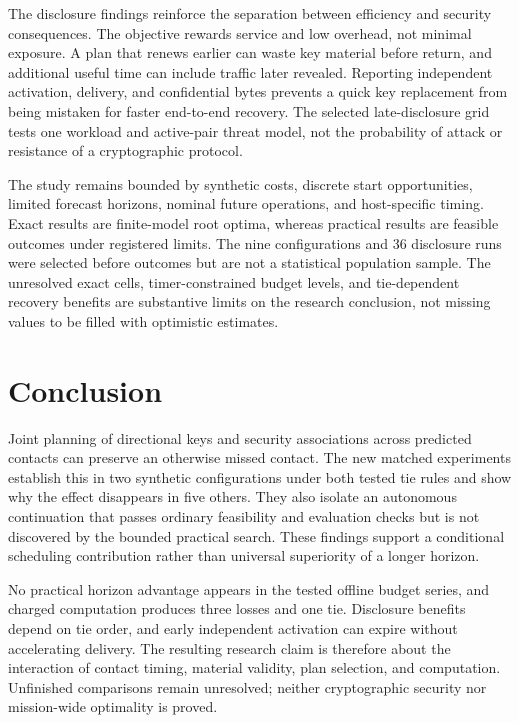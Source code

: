 \documentclass[12pt,a4paper]{article}
\begin{document}
The disclosure findings reinforce the separation between efficiency and security consequences. The objective rewards service and low overhead, not minimal exposure. A plan that renews earlier can waste key material before return, and additional useful time can include traffic later revealed. Reporting independent activation, delivery, and confidential bytes prevents a quick key replacement from being mistaken for faster end-to-end recovery. The selected late-disclosure grid tests one workload and active-pair threat model, not the probability of attack or resistance of a cryptographic protocol.

The study remains bounded by synthetic costs, discrete start opportunities, limited forecast horizons, nominal future operations, and host-specific timing. Exact results are finite-model root optima, whereas practical results are feasible outcomes under registered limits. The nine configurations and 36 disclosure runs were selected before outcomes but are not a statistical population sample. The unresolved exact cells, timer-constrained budget levels, and tie-dependent recovery benefits are substantive limits on the research conclusion, not missing values to be filled with optimistic estimates.

\section*{Conclusion}
Joint planning of directional keys and security associations across predicted contacts can preserve an otherwise missed contact. The new matched experiments establish this in two synthetic configurations under both tested tie rules and show why the effect disappears in five others. They also isolate an autonomous continuation that passes ordinary feasibility and evaluation checks but is not discovered by the bounded practical search. These findings support a conditional scheduling contribution rather than universal superiority of a longer horizon.

No practical horizon advantage appears in the tested offline budget series, and charged computation produces three losses and one tie. Disclosure benefits depend on tie order, and early independent activation can expire without accelerating delivery. The resulting research claim is therefore about the interaction of contact timing, material validity, plan selection, and computation. Unfinished comparisons remain unresolved; neither cryptographic security nor mission-wide optimality is proved.
\end{document}
